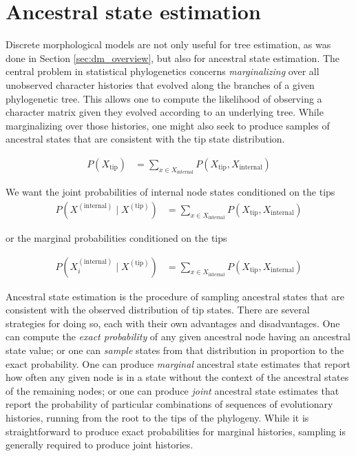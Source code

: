 \section{Ancestral state estimation} \label{sec:dm_matrix}

Discrete morphological models are not only useful for tree estimation, as was done in Section \ref{sec:dm_overview}, but also for ancestral state estimation.
The central problem in statistical phylogenetics concerns {\it marginalizing} over all unobserved character histories that evolved along the branches of a given phylogenetic tree.
This allows one to compute the likelihood of observing a character matrix given they evolved according to an underlying tree.
While marginalizing over those histories, one might also seek to produce samples of ancestral states that are consistent with the tip state distribution.

\begin{align*}
P( X_\text{tip} ) & = \sum_{x \in X_\text{internal}} P( X_\text{tip}, X_\text{internal} )
\end{align*}

We want the joint probabilities of internal node states conditioned on the tips
\begin{align*}
P( X^{(\text{internal})} \mid X^{(\text{tip})} ) & = \sum_{x \in X_\text{internal}} P( X_\text{tip}, X_\text{internal} )
\end{align*}

or the marginal probabilities conditioned on the tips

\begin{align*}
P( X_i^{(\text{internal})} \mid X^{(\text{tip})} ) & = \sum_{x \in X_\text{internal}} P( X_\text{tip}, X_\text{internal} )
\end{align*}


Ancestral state estimation is the procedure of sampling ancestral states that are consistent with the observed distribution of tip states.
There are several strategies for doing so, each with their own advantages and disadvantages.
One can compute the {\it exact probability} of any given ancestral node having an ancestral state value; or one can {\it sample} states from that distribution in proportion to the exact probability.
One can produce {\it marginal} ancestral state estimates that report how often any given node is in a state without the context of the ancestral states of the remaining nodes; or one can produce {\it joint} ancestral state estimates that report the probability of particular combinations of sequences of evolutionary histories, running from the root to the tips of the phylogeny.
While it is straightforward to produce exact probabilities for marginal histories, sampling is generally required to produce joint histories.

